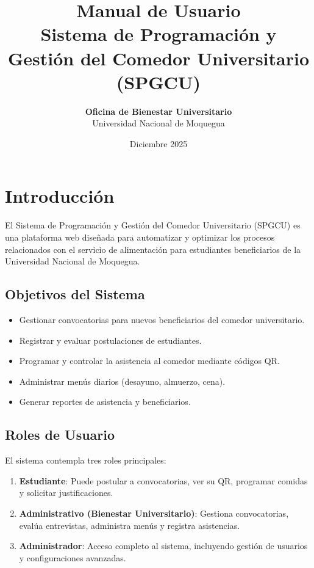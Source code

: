 \documentclass[12pt,a4paper]{article}
\title{
    \vspace{-2cm}
    \vspace{1cm}
    \vspace{1cm}
    \textbf{\Huge Manual de Usuario} \\
    \vspace{0.5cm}
    \textbf{\Large Sistema de Programación y Gestión del Comedor Universitario} \\
    \vspace{0.3cm}
    \textbf{(SPGCU)}
}
\author{
    \textbf{Oficina de Bienestar Universitario} \\
    Universidad Nacional de Moquegua
}
\date{Diciembre 2025}
\begin{document}
\maketitle
\thispagestyle{empty}
\newpage

\tableofcontents
\newpage

\section{Introducción}

El Sistema de Programación y Gestión del Comedor Universitario (SPGCU) es una plataforma web diseñada para automatizar y optimizar los procesos relacionados con el servicio de alimentación para estudiantes beneficiarios de la Universidad Nacional de Moquegua.

\subsection{Objetivos del Sistema}
\begin{itemize}
    \item Gestionar convocatorias para nuevos beneficiarios del comedor universitario.
    \item Registrar y evaluar postulaciones de estudiantes.
    \item Programar y controlar la asistencia al comedor mediante códigos QR.
    \item Administrar menús diarios (desayuno, almuerzo, cena).
    \item Generar reportes de asistencia y beneficiarios.
\end{itemize}

\subsection{Roles de Usuario}
El sistema contempla tres roles principales:

\begin{enumerate}
    \item \textbf{Estudiante}: Puede postular a convocatorias, ver su QR, programar comidas y solicitar justificaciones.
    \item \textbf{Administrativo (Bienestar Universitario)}: Gestiona convocatorias, evalúa entrevistas, administra menús y registra asistencias.
    \item \textbf{Administrador}: Acceso completo al sistema, incluyendo gestión de usuarios y configuraciones avanzadas.
\end{enumerate}
\end{document}
